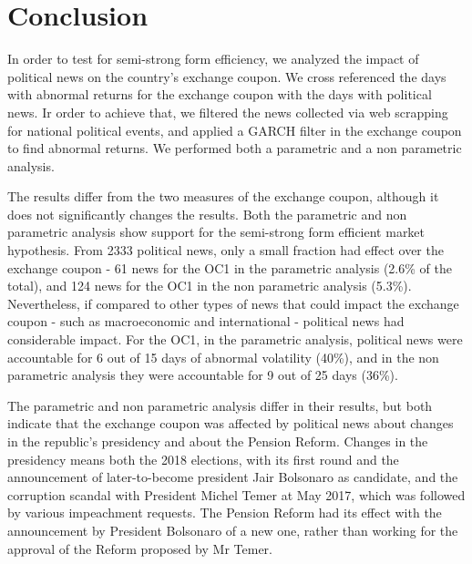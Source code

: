 \documentclass[cic,tc, english]{iiufrgs}
\begin{document}
\chapter{Conclusion} \label{chapter_conclusion}

    In order to test for semi-strong form efficiency, we analyzed the impact of political news on the country's exchange coupon. We cross referenced the days with abnormal returns for the exchange coupon with the days with political news. Ir order to achieve that, we filtered the news collected via web scrapping for national political events, and applied a GARCH filter in the exchange coupon to find abnormal returns. We performed both a parametric and a non parametric analysis.

    The results differ from the two measures of the exchange coupon, although it does not significantly changes the results. Both the parametric and non parametric analysis show support for the semi-strong form efficient market hypothesis. From 2333 political news, only a small fraction had effect over the exchange coupon - 61 news for the OC1 in the parametric analysis (2.6\% of the total), and 124 news for the OC1 in the non parametric analysis (5.3\%). Nevertheless, if compared to other types of news that could impact the exchange coupon - such as macroeconomic and international - political news had considerable impact. For the OC1, in the parametric analysis, political news were accountable for 6 out of 15 days of abnormal volatility (40\%), and in the non parametric analysis they were accountable for 9 out of 25 days (36\%).

    The parametric and non parametric analysis differ in their results, but both indicate that the exchange coupon was affected by political news about changes in the republic's presidency and about the Pension Reform. Changes in the presidency means both the 2018 elections, with its first round and the announcement of later-to-become president Jair Bolsonaro as candidate, and the corruption scandal with President Michel Temer at May 2017, which was followed by various impeachment requests. The Pension Reform had its effect with the announcement by President Bolsonaro of a new one, rather than working for the approval of the Reform proposed by Mr Temer.
\end{document}
